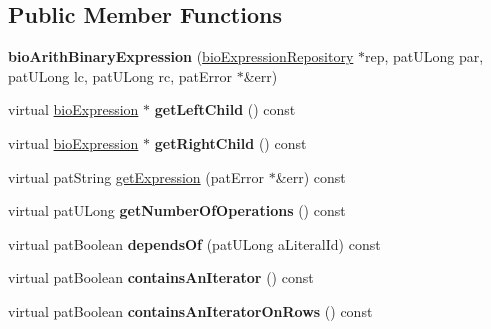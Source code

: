 \subsection*{Public Member Functions}
\begin{DoxyCompactItemize}
\item 
\mbox{\label{classbio_arith_binary_expression_a340b61c142b77764797950369eac7e28}} 
{\bfseries bio\+Arith\+Binary\+Expression} (\hyperlink{classbio_expression_repository}{bio\+Expression\+Repository} $\ast$rep, pat\+U\+Long par, pat\+U\+Long lc, pat\+U\+Long rc, pat\+Error $\ast$\&err)
\item 
\mbox{\label{classbio_arith_binary_expression_abf82c079c5929413a6f7d412fb81ba19}} 
virtual \hyperlink{classbio_expression}{bio\+Expression} $\ast$ {\bfseries get\+Left\+Child} () const
\item 
\mbox{\label{classbio_arith_binary_expression_ab1cfb7635447dd42e8b8e973c8eedc24}} 
virtual \hyperlink{classbio_expression}{bio\+Expression} $\ast$ {\bfseries get\+Right\+Child} () const
\item 
virtual pat\+String \hyperlink{classbio_arith_binary_expression_a6c48d0f1c7b6ba1b8cf3910b9ad04f93}{get\+Expression} (pat\+Error $\ast$\&err) const
\item 
\mbox{\label{classbio_arith_binary_expression_aab5f6ca86bb59b081d3d915bf58b83af}} 
virtual pat\+U\+Long {\bfseries get\+Number\+Of\+Operations} () const
\item 
\mbox{\label{classbio_arith_binary_expression_af7ad9c883086f5058e1f93d9ebcf1800}} 
virtual pat\+Boolean {\bfseries depends\+Of} (pat\+U\+Long a\+Literal\+Id) const
\item 
\mbox{\label{classbio_arith_binary_expression_add7bb73a87505b41be97b7b747e24229}} 
virtual pat\+Boolean {\bfseries contains\+An\+Iterator} () const
\item 
\mbox{\label{classbio_arith_binary_expression_a4a91bcd3d7bb68418a0e35b33d749422}} 
virtual pat\+Boolean {\bfseries contains\+An\+Iterator\+On\+Rows} () const

\end{DoxyCompactItemize}
